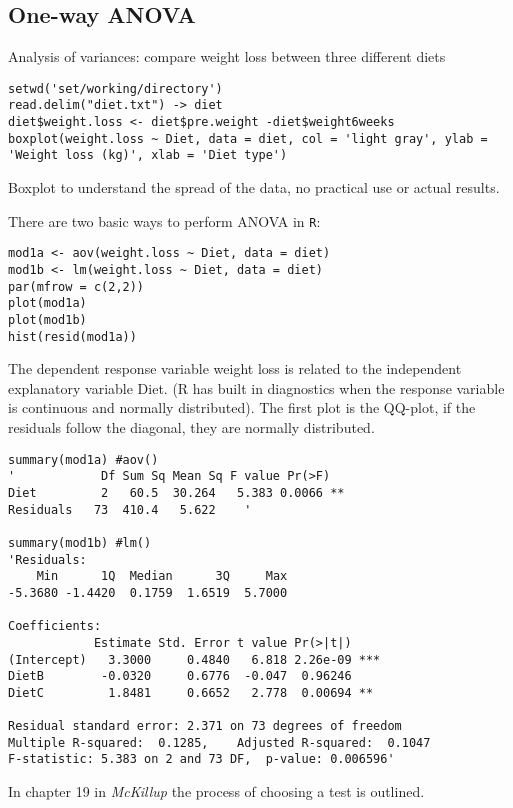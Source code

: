 \documentclass{article}
\theoremstyle{definition}
\begin{document}
\subsection{One-way ANOVA}
Analysis of variances: compare weight loss between three different diets
\begin{lstlisting}
setwd('set/working/directory')
read.delim("diet.txt") -> diet
diet$weight.loss <- diet$pre.weight -diet$weight6weeks
boxplot(weight.loss ~ Diet, data = diet, col = 'light gray', ylab = 'Weight loss (kg)', xlab = 'Diet type')
\end{lstlisting}
Boxplot to understand the spread of the data, no practical use or actual results.\par 
There are two basic ways to perform ANOVA in \texttt{R}:
\begin{lstlisting}
mod1a <- aov(weight.loss ~ Diet, data = diet)
mod1b <- lm(weight.loss ~ Diet, data = diet)
par(mfrow = c(2,2))
plot(mod1a)
plot(mod1b)
hist(resid(mod1a))
\end{lstlisting}
The dependent response variable weight loss is related to the independent explanatory variable Diet. (R has built in diagnostics when the response variable is continuous and normally distributed). The first plot is the QQ-plot, if the residuals follow the diagonal, they are normally distributed.

\begin{lstlisting}
summary(mod1a) #aov()
'            Df Sum Sq Mean Sq F value Pr(>F)   
Diet         2   60.5  30.264   5.383 0.0066 **
Residuals   73  410.4   5.622    '

summary(mod1b) #lm()
'Residuals:
    Min      1Q  Median      3Q     Max 
-5.3680 -1.4420  0.1759  1.6519  5.7000 

Coefficients:
            Estimate Std. Error t value Pr(>|t|)    
(Intercept)   3.3000     0.4840   6.818 2.26e-09 ***
DietB        -0.0320     0.6776  -0.047  0.96246    
DietC         1.8481     0.6652   2.778  0.00694 ** 

Residual standard error: 2.371 on 73 degrees of freedom
Multiple R-squared:  0.1285,	Adjusted R-squared:  0.1047 
F-statistic: 5.383 on 2 and 73 DF,  p-value: 0.006596'
\end{lstlisting}

In chapter 19 in \textit{McKillup} the process of choosing a test is outlined. 
\end{document}
